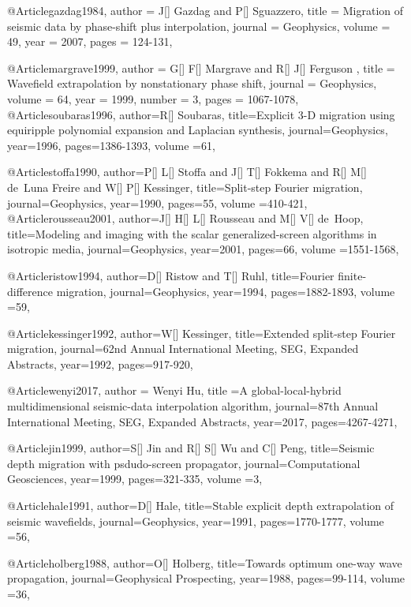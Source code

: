 @Article{gazdag1984,
  author =	 { J[] Gazdag and P[] Sguazzero},
  title =	 { Migration of seismic data by phase-shift plus interpolation},
  journal =	 {Geophysics},
  volume =	 49,
  year =	 2007,
  pages =	 {124-131},
}

@Article{margrave1999,
  author =	 { G[] F[] Margrave and R[] J[] Ferguson },
  title =	 { Wavefield extrapolation by nonstationary phase shift},
  journal =	 {Geophysics},
  volume =	 64,
  year =	 1999,
  number =	 3,
  pages =	 {1067-1078},
}
@Article{soubaras1996,
author={R[] Soubaras},
title={Explicit 3-D migration using equiripple polynomial expansion and Laplacian synthesis},
journal={Geophysics},
year=1996,
pages={1386-1393},
volume ={61},
}

@Article{stoffa1990,
author={P[] L[] Stoffa and J[] T[] Fokkema and R[] M[] de~Luna Freire and W[] P[] Kessinger},
title={Split-step {F}ourier migration},
journal={Geophysics},
year=1990,
pages={55},
volume ={410-421},
}
@Article{rousseau2001,
author={J[] H[] L[] Rousseau and M[] V[] de~Hoop},
title={Modeling and imaging with the scalar generalized-screen algorithms in isotropic media},
journal={Geophysics},
year=2001,
pages={66},
volume ={1551-1568},
}

@Article{ristow1994,
author={D[] Ristow and T[] Ruhl},
title={{F}ourier finite-difference migration},
journal={Geophysics},
year=1994,
pages={1882-1893},
volume ={59},
}

@Article{kessinger1992,
author={W[] Kessinger},
title={Extended split-step {F}ourier migration},
journal={62nd Annual International Meeting, SEG, Expanded Abstracts},
year=1992,
pages={917-920},
}

@Article{wenyi2017,
  author = {Wenyi Hu},
  title ={A global-local-hybrid multidimensional seismic-data interpolation algorithm},
  journal={87th Annual International Meeting, SEG, Expanded Abstracts},
  year=2017,
  pages={4267-4271},
}



@Article{jin1999,
author={S[] Jin and R[] S[] Wu and C[] Peng},
title={Seismic depth migration with psdudo-screen propagator},
journal={Computational Geosciences},
year=1999,
pages={321-335},
volume ={3},
}

@Article{hale1991,
author={D[] Hale},
title={Stable explicit depth extrapolation of seismic wavefields},
journal={Geophysics},
year=1991,
pages={1770-1777},
volume ={56},
}

@Article{holberg1988,
author={O[] Holberg},
title={Towards optimum one-way wave propagation},
journal={Geophysical Prospecting},
year=1988,
pages={99-114},
volume ={36},
}

